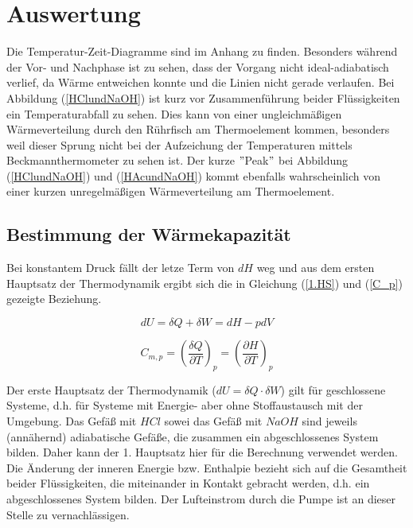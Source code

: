 \documentclass[12pt,a4paper,titlepage,headinclude,bibtotoc]{scrartcl}
\begin{document}
\newpage
\section{Auswertung}
Die Temperatur-Zeit-Diagramme sind im Anhang zu finden. Besonders während der Vor- und Nachphase ist zu sehen, dass der Vorgang nicht ideal-adiabatisch verlief, da Wärme entweichen konnte und die Linien nicht gerade verlaufen. Bei Abbildung (\ref{HClundNaOH}) ist kurz vor Zusammenführung beider Flüssigkeiten ein Temperaturabfall zu sehen. Dies kann von einer ungleichmäßigen Wärmeverteilung durch den Rührfisch am Thermoelement kommen, besonders weil dieser Sprung nicht bei der Aufzeichung der Temperaturen mittels Beckmannthermometer zu sehen ist. Der kurze $"$Peak$"$ bei Abbildung (\ref{HClundNaOH}) und (\ref{HAcundNaOH}) kommt ebenfalls wahrscheinlich von einer kurzen unregelmäßigen Wärmeverteilung am Thermoelement.\\

\subsection{Bestimmung der Wärmekapazität}

Bei konstantem Druck fällt der letze Term von $dH$ weg und aus dem ersten Hauptsatz der Thermodynamik ergibt sich die in Gleichung (\ref{1.HS}) und (\ref{C_p}) gezeigte Beziehung.

\begin{equation} \label{1.HS}
dU= \delta Q+ \delta W= dH- pdV
\end{equation}

\begin{equation}\label{C_p}
C_{\mathit{m},p}= \left(\frac{\delta Q}{\partial T}\right)_p =\left(\frac{\partial H}{\partial T}\right)_p
\end{equation}

Der erste Hauptsatz der Thermodynamik ($dU= \delta Q \cdot \delta W$) gilt für geschlossene Systeme, d.h. für Systeme mit Energie- aber ohne Stoffaustausch mit der Umgebung. Das Gefäß mit $HCl$ sowei das Gefäß mit $NaOH$ sind jeweils (annähernd) adiabatische Gefäße, die zusammen ein abgeschlossenes System bilden. Daher kann der 1. Hauptsatz hier für die Berechnung verwendet werden. Die Änderung der inneren Energie bzw. Enthalpie bezieht sich auf die Gesamtheit beider Flüssigkeiten, die miteinander in Kontakt gebracht werden, d.h. ein abgeschlossenes System bilden. Der Lufteinstrom durch die Pumpe ist an dieser Stelle zu vernachlässigen.\\
\end{document}

